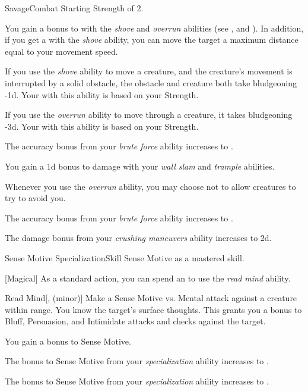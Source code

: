     \begin{feat}{Savage}{Combat}
        \featpre Starting Strength of 2.

         You gain a  bonus to  with the \textit{shove} and \textit{overrun} abilities (see , and ).
        In addition, if you get a  with the \textit{shove} ability, you can move the target a maximum distance equal to your movement speed.

         If you use the \textit{shove} ability to move a creature, and the creature's movement is interrupted by a solid obstacle, the obstacle and creature both take bludgeoning  -1d.
        Your  with this ability is based on your Strength.

         If you use the \textit{overrun} ability to move through a creature, it takes bludgeoning  -3d.
        Your  with this ability is based on your Strength.

         The accuracy bonus from your \textit{brute force} ability increases to .

         You gain a \plus1d bonus to damage with your \textit{wall slam} and \textit{trample} abilities.

         Whenever you use the \textit{overrun} ability, you may choose not to allow creatures to try to avoid you.

         The accuracy bonus from your \textit{brute force} ability increases to .

         The damage bonus from your \textit{crushing maneuvers} ability increases to \plus2d. 
    \end{feat}

    \begin{feat}{Sense Motive Specialization}{Skill}
        \featpre Sense Motive as a mastered skill.

        [Magical] As a standard action, you can spend an  to use the \textit{read mind} ability.
        \begin{ability}{Read Mind}[,  (minor)]
            Make a Sense Motive vs. Mental attack against a creature within \rngclose range.
            \hit You know the target's surface thoughts.
            This grants you a  bonus to Bluff, Persuasion, and Intimidate attacks and checks against the target.
        \end{ability}

         You gain a  bonus to Sense Motive.

         The bonus to Sense Motive from your \textit{specialization} ability increases to .

         The bonus to Sense Motive from your \textit{specialization} ability increases to .
    \end{feat}

